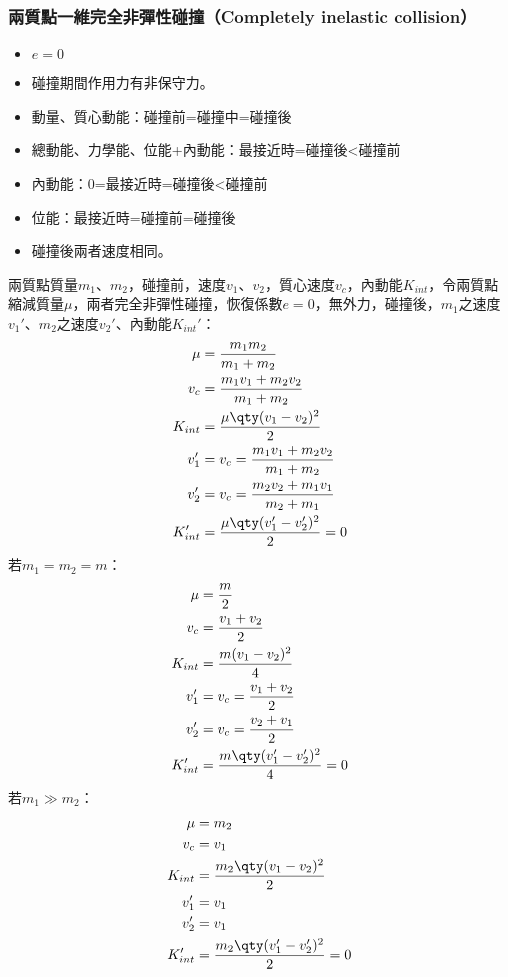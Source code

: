\documentclass[a4paper,12pt]{article}
\begin{document}
\subsubsection{兩質點一維完全非彈性碰撞（Completely inelastic collision）}
\begin{itemize}
\item $e=0$
\item 碰撞期間作用力有非保守力。
\item 動量、質心動能：碰撞前=碰撞中=碰撞後
\item 總動能、力學能、位能+內動能：最接近時=碰撞後<碰撞前
\item 內動能：0=最接近時=碰撞後<碰撞前
\item 位能：最接近時=碰撞前=碰撞後
\item 碰撞後兩者速度相同。
\end{itemize}
兩質點質量$m_1$、$m_2$，碰撞前，速度$v_1$、$v_2$，質心速度$v_c$，內動能$K_{int}$，令兩質點縮減質量$\mu$，兩者完全非彈性碰撞，恢復係數$e=0$，無外力，碰撞後，$m_1$之速度$v_1'$、$m_2$之速度$v_2'$、內動能$K_{int}'$：
\[\begin{aligned}
\mu&=\frac{m_1m_2}{m_1+m_2}\\
v_c &= \frac{m_1v_1+m_2v_2}{m_1+m_2} \\
K_{int} &= \frac{\mu\qty(v_1-v_2)^2}{2}\\
v_1' &= v_c = \frac{m_1v_1+m_2v_2}{m_1+m_2} \\
v_2' &= v_c = \frac{m_2v_2+m_1v_1}{m_2+m_1} \\
K_{int}' &= \frac{\mu \qty(v_1'-v_2')^2}{2} = 0
\end{aligned}\]
若$m_1=m_2=m$：
\[\begin{aligned}
\mu&=\frac{m}{2}\\
v_c &= \frac{v_1+v_2}{2} \\
K_{int} &= \frac{m(v_1-v_2)^2}{4}\\
v_1' &= v_c = \frac{v_1+v_2}{2} \\
v_2' &= v_c = \frac{v_2+v_1}{2} \\
K_{int}' &= \frac{m\qty(v_1'-v_2')^2}{4} = 0
\end{aligned}\]
若$m_1\gg m_2$：
\[\begin{aligned}
\mu&=m_2\\
v_c &= v_1 \\
K_{int} &= \frac{m_2\qty(v_1-v_2)^2}{2}\\
v_1' &= v_1 \\
v_2' &= v_1 \\
K_{int}' &= \frac{m_2\qty(v_1'-v_2')^2}{2} = 0
\end{aligned}\]
\end{document}
